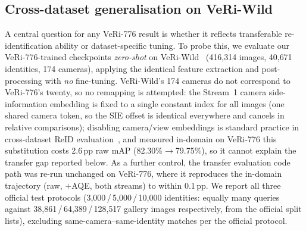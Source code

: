 \documentclass[10pt,a4paper]{article}
\begin{document}
\subsection{Cross-dataset generalisation on VeRi-Wild}
\label{sec:veriwild}
A central question for any VeRi-776 result is whether it reflects transferable
re-identification ability or dataset-specific tuning. To probe this, we
evaluate our VeRi-776-trained checkpoints \emph{zero-shot} on
VeRi-Wild~\cite{lou2019veriwild} (416{,}314 images, 40{,}671 identities, 174
cameras), applying the identical feature extraction and post-processing with
\emph{no} fine-tuning. VeRi-Wild's 174 cameras do not correspond to VeRi-776's
twenty, so no remapping is attempted: the Stream~1 camera side-information
embedding is fixed to a single constant index for all images (one shared camera
token, so the SIE offset is identical everywhere and cancels in relative
comparisons); disabling camera/view embeddings is standard practice in
cross-dataset ReID evaluation~\cite{benmabrouk2026genlimits}, and measured
in-domain on VeRi-776 this substitution costs 2.6\,pp raw mAP
(82.30\%$\rightarrow$79.75\%), so it cannot explain the transfer gap reported
below. As a further control, the transfer evaluation code path was re-run
unchanged on VeRi-776, where it reproduces the in-domain trajectory (raw,
$+$AQE, both streams) to within 0.1\,pp. We report all three official test
protocols (3{,}000\,/\,5{,}000\,/\,10{,}000 identities: equally many queries
against 38{,}861\,/\,64{,}389\,/\,128{,}517 gallery images respectively, from
the official split lists), excluding same-camera--same-identity matches per the
official protocol.
\end{document}
